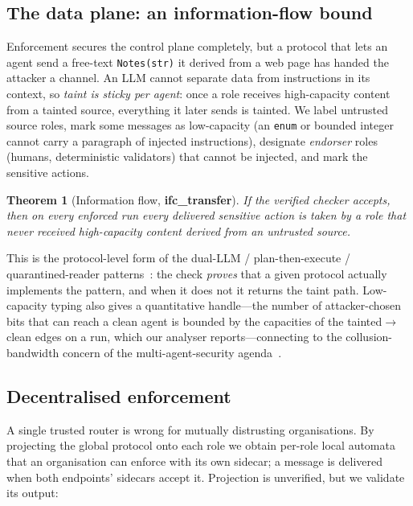 \documentclass[10pt,twocolumn]{article}
\newtheorem{theorem}{Theorem}
\newcommand{\code}[1]{\texttt{\small #1}}
\newcommand{\thm}[1]{\textcolor{dk}{\textbf{#1}}}
\begin{document}
\subsection{The data plane: an information-flow bound}

Enforcement secures the control plane completely, but a protocol that lets an agent send a free-text
\code{Notes(str)} it derived from a web page has handed the attacker a channel. An LLM cannot separate data
from instructions in its context, so \emph{taint is sticky per agent}: once a role receives high-capacity
content from a tainted source, everything it later sends is tainted. We label untrusted source roles, mark
some messages as low-capacity (an \code{enum} or bounded integer cannot carry a paragraph of injected
instructions), designate \emph{endorser} roles (humans, deterministic validators) that cannot be injected,
and mark the sensitive actions.

\begin{theorem}[Information flow, \thm{ifc\_transfer}]
If the verified checker accepts, then on every enforced run every delivered sensitive action is taken by a
role that never received high-capacity content derived from an untrusted source.
\end{theorem}

\noindent This is the protocol-level form of the dual-LLM / plan-then-execute / quarantined-reader
patterns~\cite{beurerkellner2025designpatterns,debenedetti2025camel}: the check \emph{proves} that a given protocol
actually implements the pattern, and when it does not it returns the taint path. Low-capacity typing also
gives a quantitative handle---the number of attacker-chosen bits that can reach a clean agent is bounded by
the capacities of the tainted$\to$clean edges on a run, which our analyser reports---connecting to the
collusion-bandwidth concern of the multi-agent-security
agenda~\cite{schroederdewitt2025open,hammond2025multiagent}.

\subsection{Decentralised enforcement}

A single trusted router is wrong for mutually distrusting organisations. By projecting the global protocol
onto each role we obtain per-role local automata that an organisation can enforce with its own sidecar; a
message is delivered when both endpoints' sidecars accept it. Projection is unverified, but we validate its
output:
\end{document}
